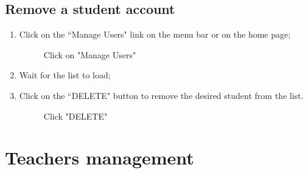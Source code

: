 \documentclass[ManualeUtente]{subfiles}
\begin{document}
	\subsection{Remove a student account}
	\begin{enumerate}
		\item Click on the \textquotedblleft Manage Users" link on the menu bar or on the home page;
		\begin{figure}[H]
			\centering
			\caption{Click on "Manage Users"}
			\label{fig:Click on "Manage Users"}
		\end{figure}
		\item Wait for the list to load;
		\item Click on the \textquotedblleft DELETE" button to remove the desired student from the list.
		\begin{figure}[H]
			\centering
			\caption{Click "DELETE"}
			\label{fig:Click "DELETE"}
		\end{figure}
	\end{enumerate}
	
	\section{Teachers management}
\end{document}

